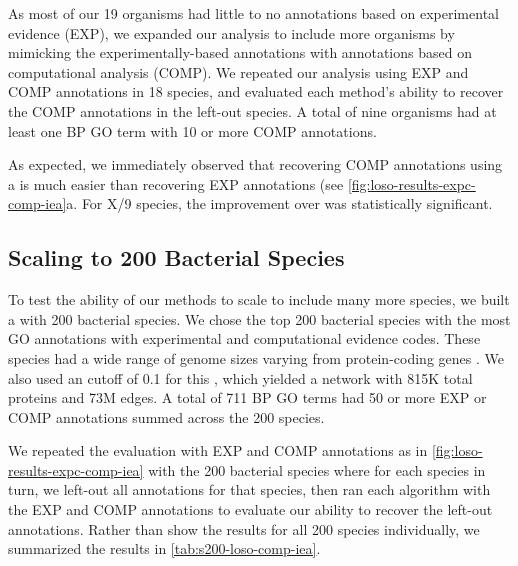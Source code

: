 As most of our 19 organisms had little to no annotations based on experimental evidence (EXP), we expanded our analysis to include more organisms by mimicking the experimentally-based annotations with annotations based on computational analysis (COMP). 
We repeated our \loso analysis using EXP and COMP annotations in 18 species, and evaluated each method's ability to recover the COMP annotations in the left-out species. A total of nine organisms had at least one BP GO term with 10 or more COMP annotations.

As expected, we immediately observed that recovering COMP annotations using a \SSN is much easier than recovering EXP annotations (see \cref{fig:loso-results-expc-comp-iea}a. For X/9 species, the improvement over \localplus was statistically significant.  


\subsection{Scaling to 200 Bacterial Species}
\label{sec:loso-s200}

To test the ability of our methods to scale to include many more species, we built a \SSN with 200 bacterial species. 
We chose the top 200 bacterial species with the most GO annotations with experimental and computational evidence codes. 
These species had a wide range of genome sizes varying from  protein-coding genes . 
We also used an \eval cutoff of 0.1 for this \SSN, which yielded a network with 815K total proteins and 73M edges.
A total of 711 BP GO terms had 50 or more EXP or COMP annotations summed across the 200 species. 

We repeated the \loso evaluation with EXP and COMP annotations as in \cref{fig:loso-results-expc-comp-iea} with the 200 bacterial species where for each species in turn, we left-out all annotations for that species, then ran each algorithm with the EXP and COMP annotations to evaluate our ability to recover the left-out annotations. Rather than show the results for all 200 species individually, we summarized the results in \cref{tab:s200-loso-comp-iea}. 


